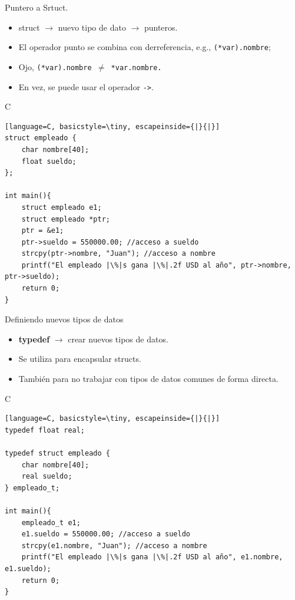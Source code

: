 \documentclass{beamer}
\begin{document}
\begin{frame}[fragile]{Puntero a Srtuct.}
\begin{itemize}
	\item struct $\rightarrow$ nuevo tipo de dato $\rightarrow$ punteros.
	\item El operador punto se combina con derreferencia, e.g., \texttt{(*var).nombre};
	\item Ojo, \texttt{(*var).nombre $\neq$ *var.nombre.}
	\item En vez, se puede usar el operador \verb+->+. 
\end{itemize}
\begin{exampleblock}{C}
\begin{lstlisting}[language=C, basicstyle=\tiny, escapeinside={|}{|}]
struct empleado {
    char nombre[40];
    float sueldo;
};

int main(){
	struct empleado e1;
	struct empleado *ptr;
	ptr = &e1;
	ptr->sueldo = 550000.00; //acceso a sueldo
	strcpy(ptr->nombre, "Juan"); //acceso a nombre
	printf("El empleado |\%|s gana |\%|.2f USD al año", ptr->nombre, ptr->sueldo); 
	return 0;
}
\end{lstlisting}
\end{exampleblock}
\end{frame}

\begin{frame}[fragile]{Definiendo nuevos tipos de datos}
\begin{itemize}
	\item \textbf{typedef} $\rightarrow$ crear nuevos tipos de datos. 
	\item Se utiliza para encapsular structs. 
	\item También para no trabajar con tipos de datos comunes de forma directa.
\end{itemize}
\begin{exampleblock}{C}
\begin{lstlisting}[language=C, basicstyle=\tiny, escapeinside={|}{|}]
typedef float real;

typedef struct empleado {
    char nombre[40];
    real sueldo;
} empleado_t;

int main(){
	empleado_t e1;
	e1.sueldo = 550000.00; //acceso a sueldo
	strcpy(e1.nombre, "Juan"); //acceso a nombre
	printf("El empleado |\%|s gana |\%|.2f USD al año", e1.nombre, e1.sueldo); 
	return 0;
}
\end{lstlisting}
\end{exampleblock}
\end{frame}
\end{document}
